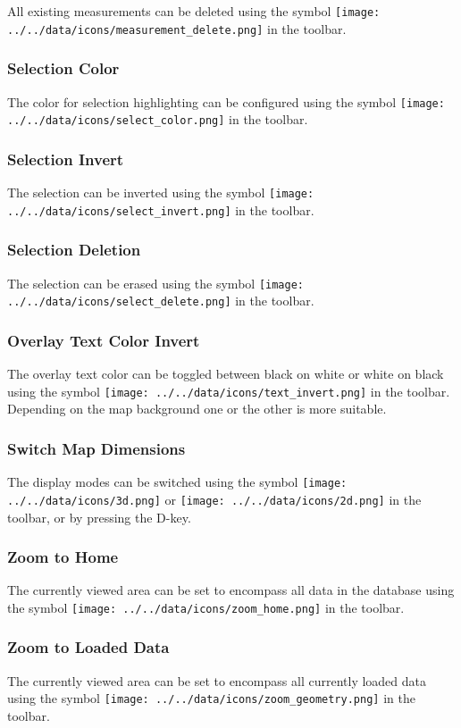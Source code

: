 All existing measurements can be deleted using the symbol \texttt{[image: ../../data/icons/measurement\_delete.png]} in the toolbar.

\subsubsection{Selection Color}

The color for selection highlighting can be configured using the symbol \texttt{[image: ../../data/icons/select\_color.png]} in the toolbar.

\subsubsection{Selection Invert}

The selection can be inverted using the symbol \texttt{[image: ../../data/icons/select\_invert.png]} in the toolbar.

\subsubsection{Selection Deletion}

The selection can be erased using the symbol \texttt{[image: ../../data/icons/select\_delete.png]} in the toolbar.

\subsubsection{Overlay Text Color Invert}

The overlay text color can be toggled between black on white or white on black using the symbol \texttt{[image: ../../data/icons/text\_invert.png]} in the toolbar. Depending on the map background one or the other is more suitable.

\subsubsection{Switch Map Dimensions}

The display modes can be switched using the symbol \texttt{[image: ../../data/icons/3d.png]} or \texttt{[image: ../../data/icons/2d.png]} in the toolbar, or by pressing the D-key. 

\subsubsection{Zoom to Home}

The currently viewed area can be set to encompass all data in the database using the symbol \texttt{[image: ../../data/icons/zoom\_home.png]} in the toolbar.

\subsubsection{Zoom to Loaded Data}

The currently viewed area can be set to encompass all currently loaded data using the symbol \texttt{[image: ../../data/icons/zoom\_geometry.png]} in the toolbar.

